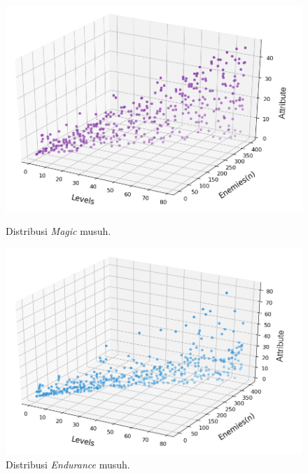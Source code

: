 \begin{figure} [!h] \centering
	\includegraphics[scale=0.6]{img/EnemyMagicDistrib.png}
	\caption{Distribusi \textit{Magic} musuh.}
	\label{fig:enemy_mag_distrib}
	\vspace{5ex}

	\includegraphics[scale=0.6]{img/EnemyEnduranceDistrib.png}
	\caption{Distribusi \textit{Endurance} musuh.}
	\label{fig:enemy_endr_distrib}
\end{figure}

